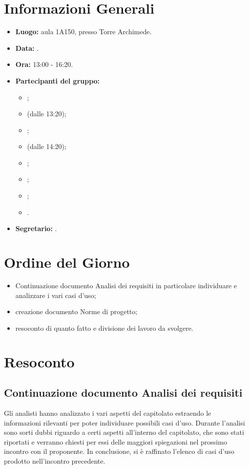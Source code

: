 \section{Informazioni Generali}
\begin{itemize}
\item \textbf{Luogo:} aula 1A150, presso Torre Archimede.
\item \textbf{Data:} \Data.
\item \textbf{Ora:} 13:00 - 16:20.
\item \textbf{Partecipanti del gruppo:}
	\begin{itemize}
		\item \AT{}; 
		\item \BR{} (dalle 13:20);
		\item \CE{}; 
		\item \DF{} (dalle 14:20);
		\item \LD{};
		\item \MC{};
		\item \PF{};
		\item \SE{}.
	\end{itemize} 
\item \textbf{Segretario:} \MC{}.
\end{itemize}


\section{Ordine del Giorno}
\begin{itemize}
	\item Continuazione documento Analisi dei requisiti in particolare individuare e analizzare i vari casi d'uso;
	\item creazione documento Norme di progetto;
	\item resoconto di quanto fatto e divisione dei lavoro da svolgere.
\end{itemize}


\section{Resoconto}
\subsection{Continuazione documento Analisi dei requisiti}
Gli analisti hanno analizzato i vari aspetti del capitolato estraendo le informazioni rilevanti per poter individuare possibili casi d’uso. Durante l’analisi sono sorti dubbi riguardo a certi aspetti all’interno del capitolato, che sono stati riportati e verranno chiesti per essi delle maggiori spiegazioni nel prossimo incontro con il proponente. In conclusione, si è raffinato l’elenco di casi d’uso prodotto nell’incontro precedente.

